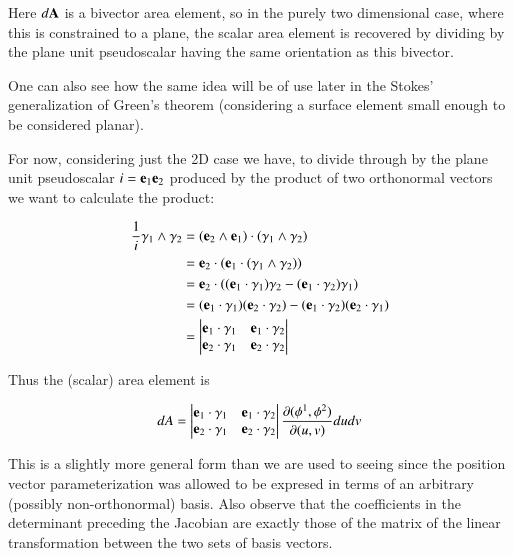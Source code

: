 \documentclass{article}
\newcommand{\PD}[2]{\frac{\partial {#2}}{\partial {#1}}}
\begin{document}
Here $d\mathbf{A}$ is a bivector area element, so in the purely two dimensional case, where this is constrained to a plane, the scalar area element
is recovered by dividing by the plane unit pseudoscalar having the same orientation as this bivector.

One can also see how the same idea will be of use later in the Stokes' generalization of Green's theorem (considering a surface element small enough to be considered planar).

For now, considering just the 2D case we have, to divide through by the plane unit pseudoscalar $i = \mathbf{e}_1\mathbf{e}_2$ produced by the product of two orthonormal vectors we want to calculate the product:

\begin{align*}
\frac{1}{i} \gamma_{1} \wedge \gamma_{2} 
&= (\mathbf{e}_2 \wedge \mathbf{e}_1) \cdot (\gamma_{1} \wedge \gamma_{2}) \\
&= \mathbf{e}_2 \cdot (\mathbf{e}_1 \cdot (\gamma_{1} \wedge \gamma_{2})) \\
&= \mathbf{e}_2 \cdot ( (\mathbf{e}_1 \cdot \gamma_{1}) \gamma_{2} -(\mathbf{e}_1 \cdot \gamma_{2}) \gamma_{1} ) \\
&= (\mathbf{e}_1 \cdot \gamma_{1}) (\mathbf{e}_2 \cdot \gamma_{2}) -(\mathbf{e}_1 \cdot \gamma_{2}) (\mathbf{e}_2 \cdot \gamma_{1}) \\
&=
\begin{vmatrix}
\mathbf{e}_1 \cdot \gamma_{1} & \mathbf{e}_1 \cdot \gamma_{2} \\
\mathbf{e}_2 \cdot \gamma_{1} & \mathbf{e}_2 \cdot \gamma_{2}
\end{vmatrix}
\end{align*}

Thus the (scalar) area element is

\begin{align}\label{eqn:jacobianframe}
dA =
\begin{vmatrix}
\Be_1 \cdot \gamma_{1} & \Be_1 \cdot \gamma_{2} \\
\Be_2 \cdot \gamma_{1} & \Be_2 \cdot \gamma_{2}
\end{vmatrix}
\PD{(u,v)}{(\phi^1,\phi^2)} du dv
\end{align}

This is a slightly more general form than we are used to seeing since the position vector parameterization was allowed to be expresed in terms
of an arbitrary (possibly non-orthonormal) basis.  Also observe that the coefficients in the determinant preceding the Jacobian are exactly those of the matrix of the linear transformation between the two sets of basis vectors.
\end{document}

